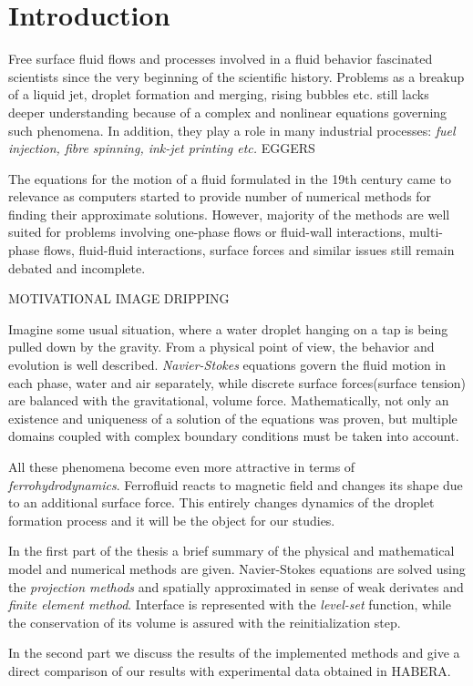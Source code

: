 \chapter*{Introduction}

\par Free surface fluid flows and processes involved in a fluid behavior fascinated scientists since the very beginning of the scientific history. Problems as a breakup of a liquid jet, droplet formation and merging, rising bubbles etc. still lacks deeper understanding because of a complex and nonlinear equations governing such phenomena. In addition, they play a role in many industrial processes: \textit{fuel injection, fibre spinning, ink-jet printing etc.} EGGERS

\par The equations for the motion of a fluid formulated in the 19th century came to relevance as computers started to provide number of numerical methods for finding their approximate solutions. However, majority of the methods are well suited for problems involving one-phase flows or fluid-wall interactions, multi-phase flows, fluid-fluid interactions, surface forces and similar issues still remain debated and incomplete.

\par MOTIVATIONAL IMAGE DRIPPING

\par Imagine some usual situation, where a water droplet hanging on a tap is being pulled down by the gravity. From a physical point of view, the behavior and evolution is well described. \textit{Navier-Stokes} equations govern the fluid motion in each phase, water and air separately, while discrete surface forces(surface tension) are balanced with the gravitational, volume force. Mathematically, not only an existence and uniqueness of a solution of the equations was proven, but multiple domains coupled with complex boundary conditions must be taken into account.

\par All these phenomena become even more attractive in terms of \textit{ferrohydrodynamics}. Ferrofluid reacts to magnetic field and changes its shape due to an additional surface force. This entirely changes dynamics of the droplet formation process and it will be the object for our studies.

\par In the first part of the thesis a brief summary of the physical and mathematical model and numerical methods are given. Navier-Stokes equations are solved using the \textit{projection methods} and spatially approximated in sense of weak derivates and \textit{finite element method}. Interface is represented with the \textit{level-set} function, while the conservation of its volume is assured with the reinitialization step.  

\par In the second part we discuss the results of the implemented methods and give a direct comparison of our results with experimental data obtained in HABERA.
